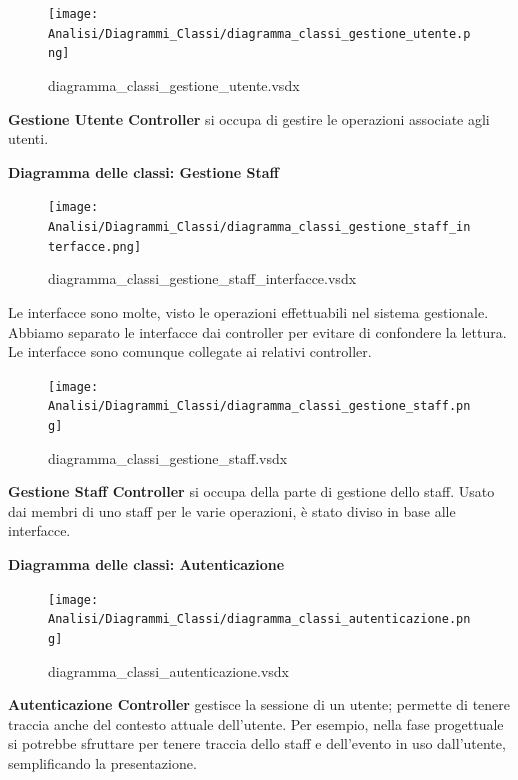 \documentclass[a4paper]{article}
\begin{document}

\begin{figure}[H]
    \texttt{[image: Analisi/Diagrammi\_Classi/diagramma\_classi\_gestione\_utente.png]}
    \centering
    \caption{diagramma\_classi\_gestione\_utente.vsdx}
\end{figure}

\textbf{Gestione Utente Controller} si occupa di gestire le operazioni associate agli utenti.

\newpage

\textbf{Diagramma delle classi: Gestione Staff}

\begin{figure}[H]
    \texttt{[image: Analisi/Diagrammi\_Classi/diagramma\_classi\_gestione\_staff\_interfacce.png]}
    \centering
    \caption{diagramma\_classi\_gestione\_staff\_interfacce.vsdx}
\end{figure}

Le interfacce sono molte, visto le operazioni effettuabili nel sistema gestionale. Abbiamo separato le interfacce dai controller per evitare di confondere la lettura. Le interfacce sono comunque collegate ai relativi controller.

\begin{figure}[H]
    \texttt{[image: Analisi/Diagrammi\_Classi/diagramma\_classi\_gestione\_staff.png]}
    \centering
    \caption{diagramma\_classi\_gestione\_staff.vsdx}
\end{figure}

\textbf{Gestione Staff Controller} si occupa della parte di gestione dello staff. Usato dai membri di uno staff per le varie operazioni, è stato diviso in base alle interfacce. 


\newpage

\textbf{Diagramma delle classi: Autenticazione}

\begin{figure}[H]
    \texttt{[image: Analisi/Diagrammi\_Classi/diagramma\_classi\_autenticazione.png]}
    \centering
    \caption{diagramma\_classi\_autenticazione.vsdx}
\end{figure}

\textbf{Autenticazione Controller} gestisce la sessione di un utente; permette di tenere traccia anche del contesto attuale dell'utente. Per esempio, nella fase progettuale si potrebbe sfruttare per tenere traccia dello staff e dell'evento in uso dall'utente, semplificando la presentazione.
\end{document}
